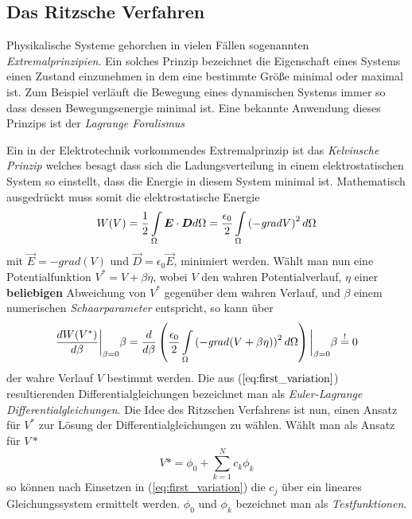 \subsection{Das Ritzsche Verfahren}
Physikalische Systeme gehorchen in vielen Fällen sogenannten \textit{Extremalprinzipien}. Ein solches Prinzip bezeichnet die Eigenschaft eines Systems einen Zustand einzunehmen in dem eine bestimmte Größe minimal oder maximal ist. Zum Beispiel verläuft die Bewegung eines dynamischen Systems immer so dass dessen Bewegungsenergie minimal ist. Eine bekannte Anwendung dieses Prinzips ist der \textit{Lagrange Foralismus}\newline

Ein in der Elektrotechnik vorkommendes Extremalprinzip ist das \textit{Kelvinsche Prinzip} welches besagt dass sich die Ladungsverteilung in einem elektrostatischen System so einstellt, dass die Energie in diesem System minimal ist.\newline
Mathematisch ausgedrückt muss somit die elektrostatische Energie 
\begin{equation}
\label{eq:functional}
W(V) = \frac{1}{2} \int\displaylimits_{\Omega} \vec{E}\cdot\vec{D} d\Omega = \frac{\epsilon_0}{2} \int\displaylimits_{\Omega} \left(-\mathit{grad}V\right)^2 d\Omega
\end{equation}
 mit $\vec{E} = -\mathit{grad}(V)$ und $\vec{D} = \epsilon_0 \vec{E}$, minimiert werden. Wählt man nun eine Potentialfunktion $V^* = V + \beta \eta$, wobei $V$ den wahren Potentialverlauf, $\eta$ einer \textbf{beliebigen} Abweichung von $V^*$ gegenüber dem wahren Verlauf, und $\beta$ einem numerischen \textit{Schaarparameter} entspricht, so kann über 
 \begin{equation}
 \label{eq:first_variation}
 \frac{dW(V^*)}{d\beta}\bigg\vert_{\beta = 0} \beta = \frac{d}{d\beta} \left(\frac{\epsilon_0}{2} \int\displaylimits_{\Omega} \left(- \mathit{grad}(V + \beta \eta)\right)^2 d\Omega \right)\bigg\vert_{\beta = 0} \beta \overset{!}{=} 0
 \end{equation} 
 der wahre Verlauf $V$ bestimmt werden.\newline
 Die aus ($\ref{eq:first_variation}$) resultierenden Differentialgleichungen bezeichnet man als \textit{Euler-Lagrange Differentialgleichungen}. Die Idee des Ritzschen Verfahrens ist nun, einen Ansatz für $V^*$ zur Lösung der Differentialgleichungen zu wählen. \newline
 Wählt man als Ansatz für $V*$
 \begin{equation}
 V* = \phi_0 + \sum_{k = 1}^{N} c_k \phi_k
 \end{equation}
 so können nach Einsetzen in (\ref{eq:first_variation}) die $c_j$ über ein lineares Gleichungssystem ermittelt werden. $\phi_0$ und $\phi_k$ bezeichnet man als \textit{Testfunktionen}.\newline
 
